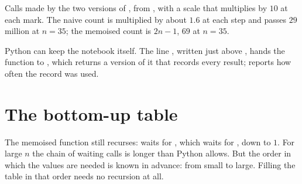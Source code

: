 \begin{omfigure}

{\small Calls made by the two versions of , from , with a scale that multiplies
by $10$ at each mark. The naive count is multiplied by about $1.6$ at each step and passes $29$ million at $n = 35$;
the memoised count is $2n - 1$, $69$ at $n = 35$.}
\end{omfigure}

Python can keep the notebook itself. The line , written just above , hands the function to
, which returns a version of it that records every result;  reports how often
the record was used.

\label{lst:g12:dynamic-programming:fib-cache}

\label{out:g12:dynamic-programming:fib-cache}

\section{The bottom-up table}\label{sec:g12:dynamic-programming:bottom-up}

The memoised function still recurses:  waits for , which waits for ,
down to $1$. For large $n$ the chain of waiting calls is longer than Python allows. But the order in which the values
are needed is known in advance: from small to large. Filling the table in that order needs no recursion at all.

